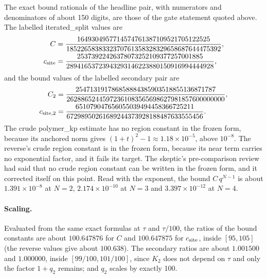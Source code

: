 The exact bound rationals of the headline pair, with numerators and
denominators of about 150 digits, are those of the gate statement quoted
above. The labelled iterated\_split values are
\begin{equation}
 \begin{aligned}
 C&=\frac{1649304957714574761387109521705122525}{1852265838332370761358328329658687644475392},\\
 c_{\rm site}&=\frac{25373922426378073252109377257001885}{28941653723943293146223880150916994444928},
 \end{aligned}
 \label{eq:bb1-reverse-values}
\end{equation}
and the bound values of the labelled secondary pair are
\begin{equation}
 \begin{aligned}
 C_2&=\frac{254713191786858884385903518855136871787}{26288652445972361083565698627981857600000000},\\
 c_{{\rm site},2}&=\frac{651079047656055039494458366725211}{67298950261689244373928188487633555456}.
 \end{aligned}
 \label{eq:bb1-secondary-values}
\end{equation}
The crude polymer\_kp estimate has
no region constant in the frozen form, because its anchored norm gives
$(1+t)^2-1\approx1.18\times10^{-5}$, above $10^{-8}$. The reverse's crude
region constant is in the frozen form, because its near term carries no
exponential factor, and it fails its target. The skeptic's pre-comparison
review had said that no crude region constant can be written in the frozen
form, and it corrected itself on this point. Read with the exponent, the
bound $C\,q^{N-1}$ is about $1.391\times10^{-8}$ at $N=2$,
$2.174\times10^{-10}$ at $N=3$ and $3.397\times10^{-12}$ at $N=4$.

\paragraph{Scaling.} Evaluated from the same exact formulas at $\tau$ and
$\tau/100$, the ratios of the bound constants are about $100.647876$ for $C$
and $100.647875$ for $c_{\rm site}$, inside $[95,105]$ (the reverse values
give about $100.638$). The secondary ratios are about $1.001500$ and
$1.000000$, inside $[99/100,101/100]$, since $K_2$ does not depend on $\tau$
and only the factor $1+q_2$ remains; and $q_2$ scales by exactly 100.

